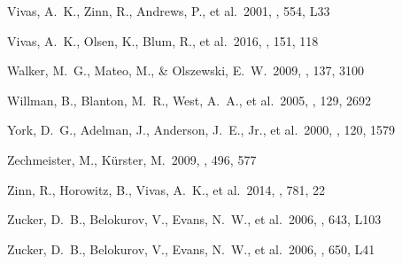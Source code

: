 \documentclass[iop]{emulateapj}
\begin{document}
\begin{thebibliography}{}
 Vivas, A.~K., Zinn, R., Andrews, P., et al.\ 2001, \apjl, 554, L33 

 Vivas, A.~K., Olsen, K., Blum, R., et al.\ 2016, \aj, 151, 118 

 Walker, M.~G., Mateo, M., \& Olszewski, E.~W.\ 2009, \aj, 137, 3100 

 Willman, B., Blanton, M.~R., West, A.~A., et al.\ 2005, \aj, 129, 2692 

 York, D.~G., Adelman, J., Anderson, J.~E., Jr., et al.\ 2000, \aj, 120, 1579 

 Zechmeister, M., K\"{u}rster, M.\ 2009, \aap, 496, 577 

{Zinn}, R., {Horowitz}, B., {Vivas}, A.~K., et al.\ 2014, \apj, 781, 22

 Zucker, D.~B., Belokurov, V., Evans, N.~W., et al.\ 2006, \apjl, 643, L103 

 Zucker, D.~B., Belokurov, V., Evans, N.~W., et al.\ 2006, \apjl, 650, L41 


\end{thebibliography}
\clearpage
\end{document}
